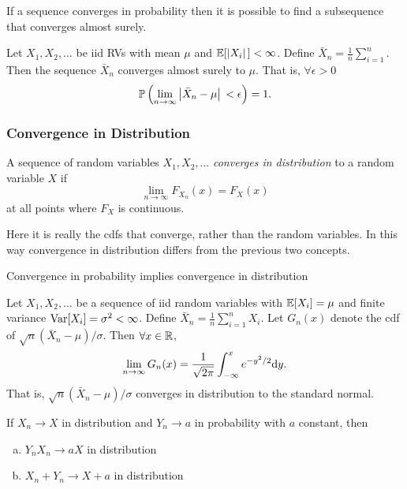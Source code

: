 \begin{theorem}
    If a sequence converges in probability then it is possible to find a subsequence that converges almost surely.
\end{theorem}

\begin{theorem}
    Let $X_1, X_2, \dots$ be iid RVs with mean $\mu$ and $\mathbb{E}{}[\left\vert{} X_i \right\vert{}] < \infty$. Define $\bar{X}_n = \frac1n \sum_{i=1}^n$. Then the sequence $\bar{X}_n$ converges almost surely to $\mu$. That is, $\forall \epsilon > 0$
    \[
         \mathbb{P}{}\left(\lim_{n\to\infty}\left\vert{} \bar{X}_n - \mu \right\vert{} < \epsilon\right) = 1.
    \]
\end{theorem}
    
\subsubsection{Convergence in Distribution}

\begin{definition}
    A sequence of random variables $X_1, X_2, \dots$ \emph{converges in distribution} to a random variable $X$ if
    \[
        \lim_{n \to \infty} F_{X_n}(x) = F_X(x)
    \]
    at all points where $F_X$ is continuous.
\end{definition}

\begin{remark}
    Here it is really the cdfs that converge, rather than the random variables. In this way convergence in distribution differs from the previous two concepts.
\end{remark}

\begin{theorem}
    Convergence in probability implies convergence in distribution
\end{theorem}


\begin{theorem}
    Let $X_1, X_2, \dots$ be a sequence of iid random variables with $\mathbb{E}{}[X_i] = \mu$ and finite variance $\text{Var}{}[X_i] = \sigma^2 < \infty$. Define $\bar{X}_n = \frac1n \sum_{i=1}^n X_i$. Let $G_n(x)$ denote the cdf of $\sqrt{n}(\bar{X}_n - \mu)/\sigma$. Then $\forall x \in \mathbb{R}$,
    \[
        \lim_{n\to\infty} G_n(x) = \frac{1}{\sqrt{2\pi}} \int_{-\infty}^x e^{-y^2/2}\text{d}{}y.
    \]
    That is, $\sqrt{n}(\bar{X}_n - \mu)/\sigma$ converges in distribution to the standard normal.
\end{theorem}

\begin{theorem}
    If $X_n \to X$ in distribution and $Y_n \to a$ in probability with $a$ constant, then
    \begin{enumerate}[a.]
        \item $Y_nX_n \to aX$ in distribution
        \item $X_n + Y_n \to X + a$ in distribution
    \end{enumerate}
\end{theorem}

